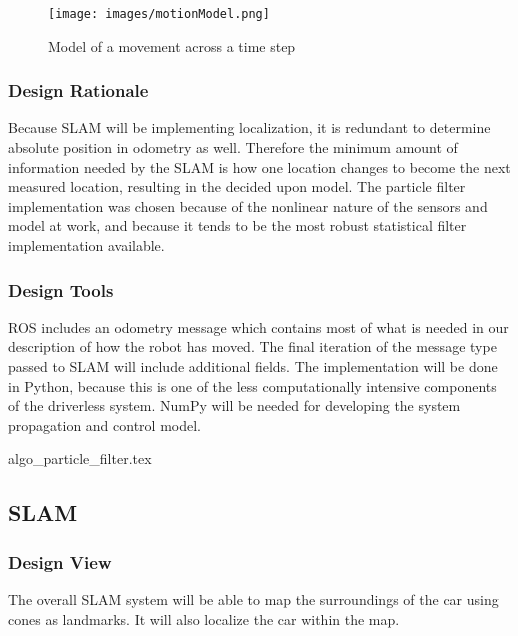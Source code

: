 \documentclass[10pt, onecolumn, draftclsnofoot, letterpaper,compsoc]{IEEEtran}
\begin{document}
\begin{figure}[htbp]
\centering
\label{fig:motionModel}
\caption{Model of a movement across a time step}
\texttt{[image: images/motionModel.png]}
\end{figure}

\subsubsection{Design Rationale} %
Because SLAM will be implementing localization, it is redundant to determine absolute position in odometry as well. Therefore the minimum amount of information needed by the SLAM is how one location changes to become the next measured location, resulting in the decided upon model. The particle filter implementation was chosen because of the nonlinear nature of the sensors and model at work, and because it tends to be the most robust statistical filter implementation available. 

\subsubsection{Design Tools} %
ROS includes an odometry message which contains most of what is needed in our description of how the robot has moved. The final iteration of the message type passed to SLAM will include additional fields. The implementation will be done in Python, because this is one of the less computationally intensive components of the driverless system. NumPy will be needed for developing the system propagation and control model.

\begin{algorithm}
\caption{Particle Filter}
\label{alg:particleFilter}
\begin{algorithmic}[1]
{algo_particle_filter.tex}
\end{algorithmic}
\end{algorithm}

\newpage


\subsection{SLAM}
\subsubsection{Design View}
The overall SLAM system will be able to map the surroundings of the car using cones as landmarks. It will also localize the car within the map. 
\end{document}

